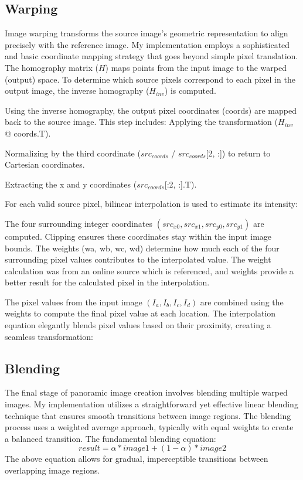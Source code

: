 \documentclass[12pt, letterpaper, ]{article}
\begin{document}
\subsection{Warping}
Image warping transforms the source image's geometric representation to align precisely with the reference image. My implementation employs a sophisticated and basic coordinate mapping strategy that goes beyond simple pixel translation.
The homography matrix ($H$) maps points from the input image to the warped (output) space. To determine which source pixels correspond to each pixel in the output image, the inverse homography ($H_{inv}$) is computed.

Using the inverse homography, the output pixel coordinates (coords) are mapped back to the source image. This step includes:
Applying the transformation ($H_{inv}$ @ coords.T).

Normalizing by the third coordinate ($src_{coords}$ / $src_{coords}$[2, :]) to return to Cartesian coordinates.

Extracting the x and y coordinates ($src_{coords}$[:2, :].T).

For each valid source pixel, bilinear interpolation is used to estimate its intensity:

The four surrounding integer coordinates $(src_{x0}, src_{x1}, src_{y0}, src_{y1})$ are computed.
Clipping ensures these coordinates stay within the input image bounds. The weights (wa, wb, wc, wd) determine how much each of the four surrounding pixel values contributes to the interpolated value. The weight calculation was from an online source which is referenced, and weights provide a better result for the calculated pixel in the interpolation.

The pixel values from the input image $(I_a, I_b, I_c, I_d)$ are combined using the weights to compute the final pixel value at each location. The interpolation equation elegantly blends pixel values based on their proximity, creating a seamless transformation:

\subsection{Blending}
The final stage of panoramic image creation involves blending multiple warped images. My implementation utilizes a straightforward yet effective linear blending technique that ensures smooth transitions between image regions.
The blending process uses a weighted average approach, typically with equal weights to create a balanced transition. The fundamental blending equation:
\[ result = \alpha * image1 + (1-\alpha) * image2 \]
The above equation allows for gradual, imperceptible transitions between overlapping image regions.
\end{document}

